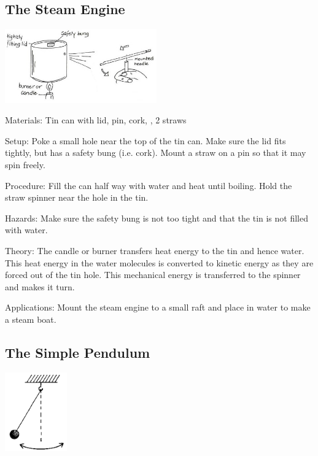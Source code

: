 \begin{multicols}{2}
\subsection{The Steam Engine}

\begin{center}
\includegraphics[width=0.49\textwidth]{./img/vso/steam-engine.jpg}
\end{center}

\begin{description*}
\item[Materials:]{Tin can with lid, pin, cork, , 2 straws}
\item[Setup:]{Poke a small hole near the top of the tin can. Make sure the lid fits tightly, but has a safety bung (i.e. cork). Mount a straw on a pin so that it may spin freely.}
\item[Procedure:]{Fill the can half way with water and heat until boiling. Hold the straw spinner near the hole in the tin.}
\item[Hazards:]{Make sure the safety bung is not too tight and that the tin is not filled with water.}
\item[Theory:]{The candle or burner transfers heat energy to the tin and hence water. This heat energy in the water molecules is converted to kinetic energy as they are forced out of the tin hole. This mechanical energy is transferred to the spinner and makes it turn.}
\item[Applications:]{Mount the steam engine to a small raft and place in water to make a steam boat.}
\end{description*}

\columnbreak

\subsection{The Simple Pendulum}

\begin{center}
\includegraphics[width=0.2\textwidth]{./img/source/pendulum.png}
\end{center}


\end{multicols}
